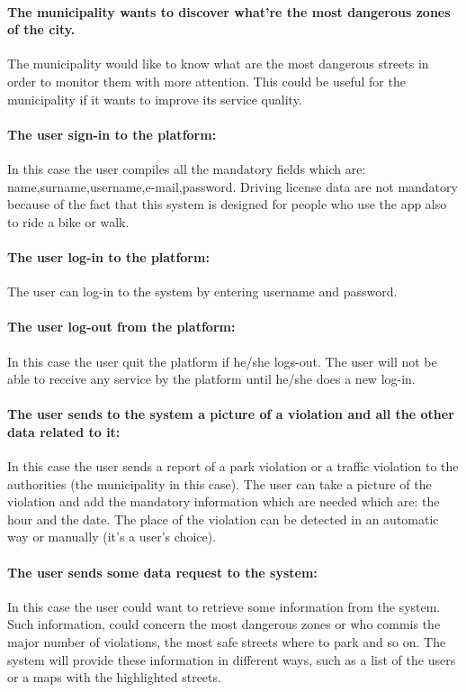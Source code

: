 \documentclass[titlepage]{article}
\begin{document}
\paragraph{The municipality wants to discover what're the most dangerous zones of the city.}
The municipality would like to know what are the most dangerous streets in order to monitor them with more attention. This could be useful for the municipality if it wants to improve its service quality.
\paragraph{The user sign-in to the platform: }
In this case the user compiles all the mandatory fields which are: name,surname,username,e-mail,password. Driving license data are not mandatory because of the fact that this system is designed for people who use the app also to ride a bike or walk.
\paragraph{The user log-in to the platform: }
The user can log-in to the system by entering username and password.
\paragraph{The user log-out from the platform:}
In this case the user quit the platform if he/she logs-out. The user will not be able to receive any service  by the platform until he/she does a new log-in.
\paragraph{The user sends to the system a picture of a            	violation and all the other data related to it: }
In this case the user sends a report of a park violation or a traffic violation to the authorities (the municipality in this case). The user can take a picture of the violation and add the mandatory information which are needed which are: the hour and the date. The place of the violation can be detected in an automatic way or manually (it's a user's choice).
\paragraph{The user sends some data request to the system: }
In this case the user could want to retrieve some information from the system. Such information, could concern the most dangerous zones or who commis the major number of violations, the most safe streets where to park and so on. The system will provide these information in different ways, such as a list of the users or a maps with the highlighted streets.
\end{document}
